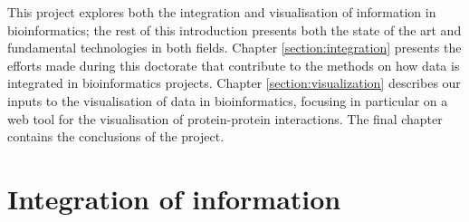 This project explores both the integration and visualisation of information in bioinformatics; the rest of this introduction presents both the state of the art and fundamental technologies in both fields. Chapter \ref{section:integration} presents the efforts made during this doctorate that contribute to the methods on how data is integrated in bioinformatics projects. Chapter \ref{section:visualization} describes our inputs to the visualisation of data in bioinformatics, focusing in particular on a web tool for the visualisation of protein-protein interactions. The final chapter contains the conclusions of the project.

\section{Integration of information}
